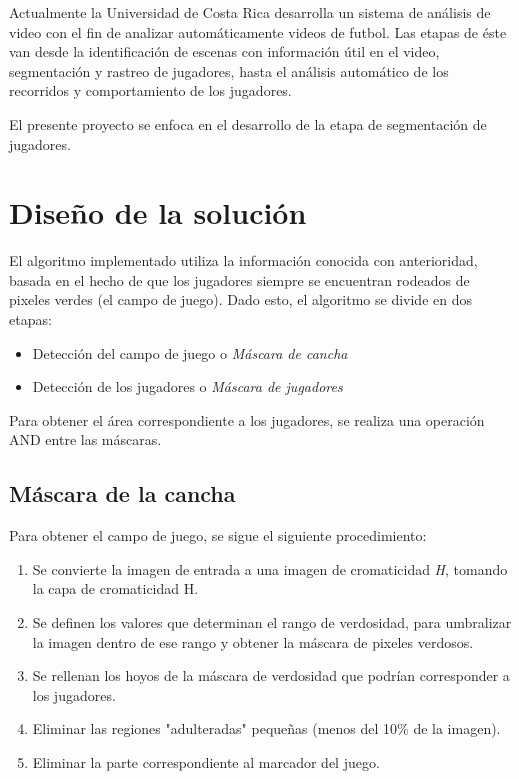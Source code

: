 \documentclass{IEEEtran}
\begin{document}
Actualmente la Universidad de Costa Rica desarrolla un sistema de an\'alisis de video con el fin de analizar autom\'aticamente videos de futbol. Las etapas de \'este van desde la identificaci\'on de escenas con informaci\'on \'util en el video, segmentaci\'on y rastreo de jugadores, hasta el an\'alisis autom\'atico de los recorridos y comportamiento de los jugadores.

El presente proyecto se enfoca en el desarrollo de la etapa de segmentaci\'on de jugadores.

\section{Dise\~no de la soluci\'on}

El algoritmo implementado utiliza la informaci\'on conocida con anterioridad, basada en el hecho de que los jugadores siempre se encuentran rodeados de pixeles verdes (el campo de juego). Dado esto, el algoritmo se divide en dos etapas:

\begin{itemize}
\item Detecci\'on del campo de juego o \emph{M\'ascara de cancha}
\item Detecci\'on de los jugadores o \emph{M\'ascara de jugadores}
\end{itemize}

Para obtener el \'area correspondiente a los jugadores, se realiza una operaci\'on AND entre las m\'ascaras.

\subsection{M\'ascara de la cancha}

Para obtener el campo de juego, se sigue el siguiente procedimiento:

\begin{enumerate}
\item Se convierte la imagen de entrada a una imagen de cromaticidad \emph{H}, tomando la capa de cromaticidad H.
\item Se definen los valores que determinan el rango de verdosidad, para umbralizar la imagen dentro de ese rango y obtener la m\'ascara de pixeles verdosos.
\item Se rellenan los hoyos de la m\'ascara de verdosidad que podr\'ian corresponder a los jugadores.
\item Eliminar las regiones "adulteradas" peque\~nas (menos del 10\% de la imagen).
\item Eliminar la parte correspondiente al marcador del juego.
\end{enumerate}
\end{document}

